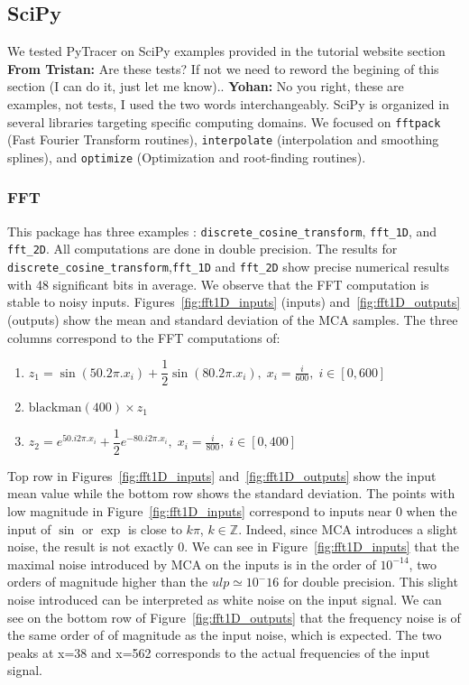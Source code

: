 \documentclass[11pt]{article}
\newcommand{\tristan}[1]{\color{orange}\textbf{From Tristan:} #1\color{black}\xspace}
\newcommand{\Yohan}[1]{\color{green!75!black}\textbf{Yohan:} #1\color{black}\xspace}
\newcommand{\pytracer}[0]{PyTracer\xspace}
\begin{document}
\subsection{SciPy}
\label{sec:scipy_tests}

We tested \pytracer on SciPy examples provided in the tutorial website section 
\tristan{Are these tests? If not we need to reword the begining of this section (I can do it, just let me know).}.
\Yohan{No you right, these are examples, not tests, I used the two words interchangeably.}
SciPy is organized in several libraries targeting specific computing domains. We focused on \texttt{fftpack} (Fast Fourier Transform routines), \texttt{interpolate} (interpolation and smoothing splines), and \texttt{optimize} (Optimization and root-finding routines).

\subsubsection{FFT}

This package has three examples : \texttt{discrete\_cosine\_transform}, \texttt{fft\_1D}, and \texttt{fft\_2D}. All computations are done in double precision.
The results for \texttt{discrete\_cosine\_transform},\texttt{fft\_1D} and  \texttt{fft\_2D} show
precise numerical results with 48 significant bits in average. 
We observe that the FFT computation is stable to noisy inputs. Figures~\ref{fig:fft1D_inputs} (inputs) and~\ref{fig:fft1D_outputs} (outputs)
show the mean and standard deviation of the MCA samples. 
The three columns correspond to the FFT computations of: 
\begin{enumerate}
\item $z_1 = \sin(50 . 2\pi . x_i) + \dfrac{1}{2} \sin(80 . 2\pi . x_i),\; x_i = \frac{i}{600},\; i \in [0,600]$
\item $\mathrm{blackman}(400) \times z_1$
\item $ z_2= e^{50 . i 2\pi . x_i} + \dfrac{1}{2} e^{-80 . i2\pi .x_i },\; x_i = \frac{i}{800},\; i \in [0,400] $
\end{enumerate}

Top row in Figures~\ref{fig:fft1D_inputs} and~\ref{fig:fft1D_outputs} 
show the input mean value while the bottom row shows the standard deviation.
The points with low magnitude in Figure~\ref{fig:fft1D_inputs} correspond 
to inputs near 0 when the input of $\sin$ or 
$\exp$ is close to $k\pi$, $k \in \mathbb{Z}$.
Indeed, since MCA introduces a slight noise, the result is not exactly 0.
We can see in Figure~\ref{fig:fft1D_inputs} 
that the maximal noise introduced by MCA on the
inputs is in the order of $10^{-14}$, two orders of magnitude higher than the 
$ulp \simeq 10^-16$ for double precision. 
This slight noise introduced can be interpreted as white noise on the input signal. 
We can see on the bottom row of Figure~\ref{fig:fft1D_outputs} that the frequency noise is of 
the same order of of magnitude as the input noise, which is expected. 
The two peaks at x=38 and x=562 corresponds to the actual frequencies of the input signal.
\end{document}
